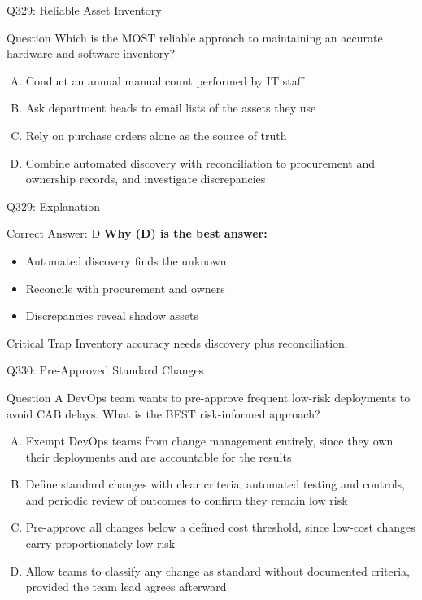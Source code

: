 \documentclass{beamer}
\begin{document}
	\begin{frame}{Q329: Reliable Asset Inventory}
		\begin{block}{Question}
			\small Which is the MOST reliable approach to maintaining an accurate hardware and software inventory?
		\end{block}
		\begin{enumerate}[(A)]
			\footnotesize
			\item Conduct an annual manual count performed by IT staff
			\item Ask department heads to email lists of the assets they use
			\item Rely on purchase orders alone as the source of truth
			\item Combine automated discovery with reconciliation to procurement and ownership records, and investigate discrepancies
		\end{enumerate}
	\end{frame}
	
	\begin{frame}{Q329: Explanation}
		\begin{block}{Correct Answer: D}
			\textbf{Why (D) is the best answer:}
			\begin{itemize}
				\item Automated discovery finds the unknown
				\item Reconcile with procurement and owners
				\item Discrepancies reveal shadow assets
			\end{itemize}
		\end{block}
		\begin{alertblock}{Critical Trap}
			Inventory accuracy needs discovery plus reconciliation.
		\end{alertblock}
	\end{frame}
	
	\begin{frame}{Q330: Pre-Approved Standard Changes}
		\begin{block}{Question}
			\small A DevOps team wants to pre-approve frequent low-risk deployments to avoid CAB delays. What is the BEST risk-informed approach?
		\end{block}
		\begin{enumerate}[(A)]
			\footnotesize
			\item Exempt DevOps teams from change management entirely, since they own their deployments and are accountable for the results
			\item Define standard changes with clear criteria, automated testing and controls, and periodic review of outcomes to confirm they remain low risk
			\item Pre-approve all changes below a defined cost threshold, since low-cost changes carry proportionately low risk
			\item Allow teams to classify any change as standard without documented criteria, provided the team lead agrees afterward
		\end{enumerate}
	\end{frame}
	
\end{document}
